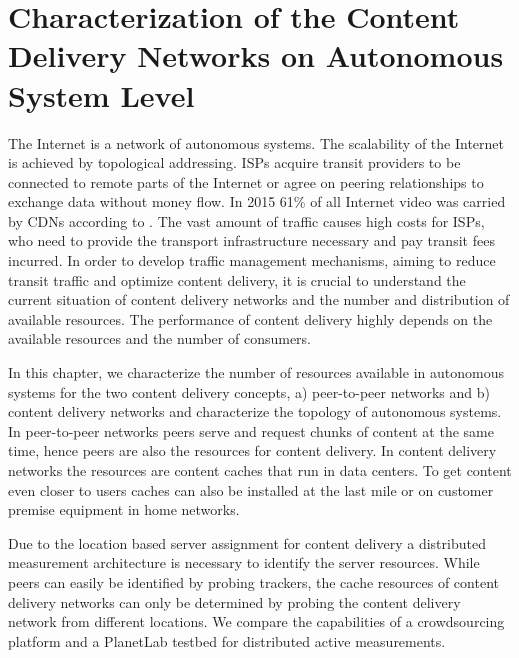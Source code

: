 \chapter{Characterization of the Content Delivery Networks on Autonomous System Level}\label{chap:aslevel}

The Internet is a network of autonomous systems.
The scalability of the Internet is achieved by topological addressing.
ISPs acquire transit providers to be connected to remote parts of the Internet or agree on peering relationships to exchange data without money flow.
In 2015 61\% of all Internet video was carried by CDNs according to \cite{cisco}.
The vast amount of traffic causes high costs for ISPs, who need to provide the transport infrastructure necessary and pay transit fees incurred.
In order to develop traffic management mechanisms, aiming to reduce transit traffic and optimize content delivery, it is crucial to understand the current situation of content delivery networks and the number and distribution of available resources.
The performance of content delivery highly depends on the available resources and the number of consumers.


In this chapter, we characterize the number of resources available in autonomous systems for the two content delivery concepts, a) peer-to-peer networks and b) content delivery networks and characterize the topology of autonomous systems.
In peer-to-peer networks peers serve and request chunks of content at the same time, hence peers are also the resources for content delivery.
In content delivery networks the resources are content caches that run in data centers. To get content even closer to users caches can also be installed at the last mile or on customer premise equipment in home networks.

Due to the location based server assignment for content delivery a distributed measurement architecture is necessary to identify the server resources.
While peers can easily be identified by probing trackers, the cache resources of content delivery networks can only be determined by probing the content delivery network from different locations.
We compare the capabilities of a crowdsourcing platform and a PlanetLab testbed for distributed active measurements.

